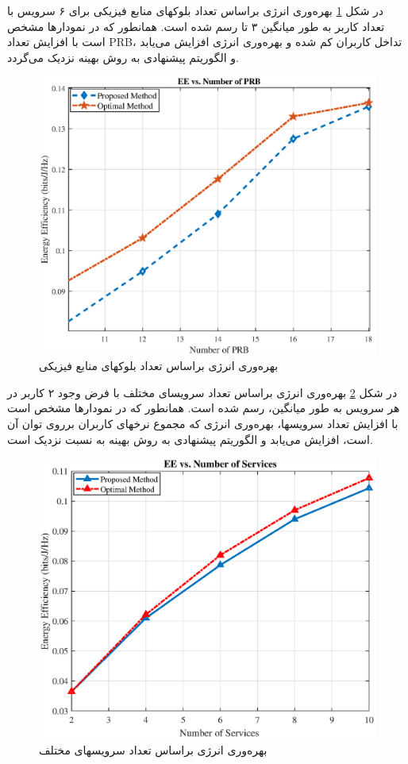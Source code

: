 در شکل \ref{fig:f1a2}
بهره‌وری انرژی براساس تعداد بلوکهای منابع فیزیکی برای ۶ سرویس با تعداد کاربر به طور میانگین ۳ تا رسم شده است. همانطور که در نمودارها مشخص است با افزایش تعداد PRB، تداخل کاربران کم شده و بهره‌وری انرژی افزایش می‌یابد و الگوریتم پیشنهادی به روش بهینه نزدیک می‌گردد.  
\begin{figure}%
	\centering
	\includegraphics[width=\linewidth]{./fig/fig_prb}
	\caption{بهره‌وری انرژی براساس تعداد بلوکهای منابع فیزیکی}
	\label{fig:f1a2}
\end{figure}

در شکل \ref{fig:f1a3}
بهره‌وری انرژی براساس تعداد سرویسای مختلف با فرض وجود ۲ کاربر در هر سرویس به طور میانگین، رسم شده است. همانطور که در نمودارها مشخص است با افزایش تعداد سرویسها، بهره‌وری انرژی که مجموع نرخهای کاربران برروی توان آن است، افزایش می‌یابد و الگوریتم پیشنهادی به روش بهینه به نسبت نزدیک است‌.  
\begin{figure}%
	\centering
	\includegraphics[width=\linewidth]{./fig/fig_service}
	\caption{بهره‌وری انرژی براساس تعداد سرویسهای مختلف }
	\label{fig:f1a3}
\end{figure}



